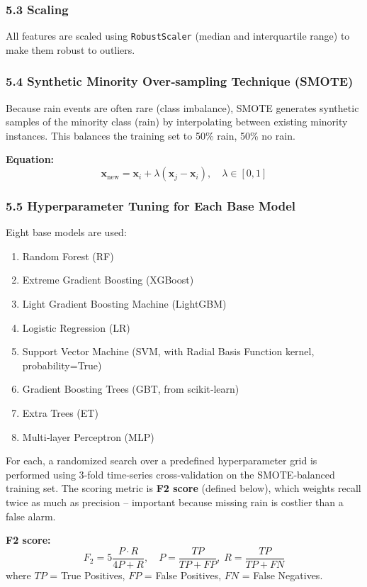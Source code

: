 \documentclass[12pt]{article}
\begin{document}
	\subsubsection{5.3 Scaling}
	All features are scaled using \texttt{RobustScaler} (median and interquartile range) to make them robust to outliers.
	
	\subsubsection{5.4 Synthetic Minority Over‑sampling Technique (SMOTE)}
	Because rain events are often rare (class imbalance), SMOTE generates synthetic samples of the minority class (rain) by interpolating between existing minority instances. This balances the training set to 50\% rain, 50\% no rain.
	
	\textbf{Equation:}
	\[
	\mathbf{x}_{\text{new}} = \mathbf{x}_i + \lambda(\mathbf{x}_j - \mathbf{x}_i),\quad \lambda\in[0,1]
	\]
	
	\subsubsection{5.5 Hyperparameter Tuning for Each Base Model}
	Eight base models are used:
	\begin{enumerate}
		\item Random Forest (RF)
		\item Extreme Gradient Boosting (XGBoost)
		\item Light Gradient Boosting Machine (LightGBM)
		\item Logistic Regression (LR)
		\item Support Vector Machine (SVM, with Radial Basis Function kernel, probability=True)
		\item Gradient Boosting Trees (GBT, from scikit‑learn)
		\item Extra Trees (ET)
		\item Multi‑layer Perceptron (MLP)
	\end{enumerate}
	For each, a randomized search over a predefined hyperparameter grid is performed using 3‑fold time‑series cross‑validation on the SMOTE‑balanced training set. The scoring metric is \textbf{F2 score} (defined below), which weights recall twice as much as precision – important because missing rain is costlier than a false alarm.
	
	\textbf{F2 score:}
	\[
	F_2 = 5\frac{P\cdot R}{4P + R},\quad P=\frac{TP}{TP+FP},\; R=\frac{TP}{TP+FN}
	\]
	where $TP$ = True Positives, $FP$ = False Positives, $FN$ = False Negatives.
	
\end{document}
